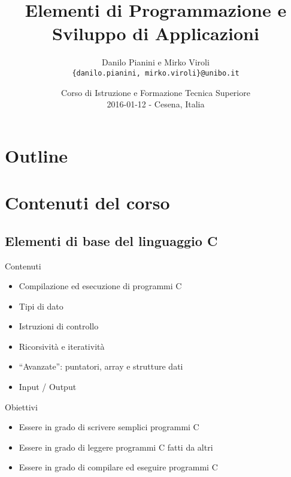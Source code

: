 \documentclass[presentation]{beamer} %
\title[Introduction]{Elementi di Programmazione e Sviluppo di Applicazioni}
\author[Pianini, Viroli]{
Danilo Pianini e Mirko Viroli\\
\texttt{{\footnotesize \{danilo.pianini, mirko.viroli\}@unibo.it}}}
\institute[UniBo]
{\textsc{Alma Mater Studiorum}---Universit\`a di Bologna a Cesena}
\date[\today]{Corso di Istruzione e Formazione Tecnica Superiore\\
\scriptsize 2016-01-12 - Cesena, Italia
}
\begin{document}

\frame[label=coverpage]{\titlepage}

\section*{Outline}
\frame{\tableofcontents}

\section{Contenuti del corso}

\subsection{Elementi di base del linguaggio C}

\begin{frame}
	\begin{block}{Contenuti}
		\begin{itemize}
			\item Compilazione ed esecuzione di programmi C
			\item Tipi di dato
			\item Istruzioni di controllo
			\item Ricorsività e iteratività
			\item ``Avanzate'': puntatori, array e strutture dati
			\item Input / Output
		\end{itemize}
	\end{block}
	\begin{block}{Obiettivi}
		\begin{itemize}
			\item Essere in grado di scrivere semplici programmi C
			\item Essere in grado di leggere programmi C fatti da altri
			\item Essere in grado di compilare ed eseguire programmi C
		\end{itemize}
	\end{block}
\end{frame}
\end{document}
